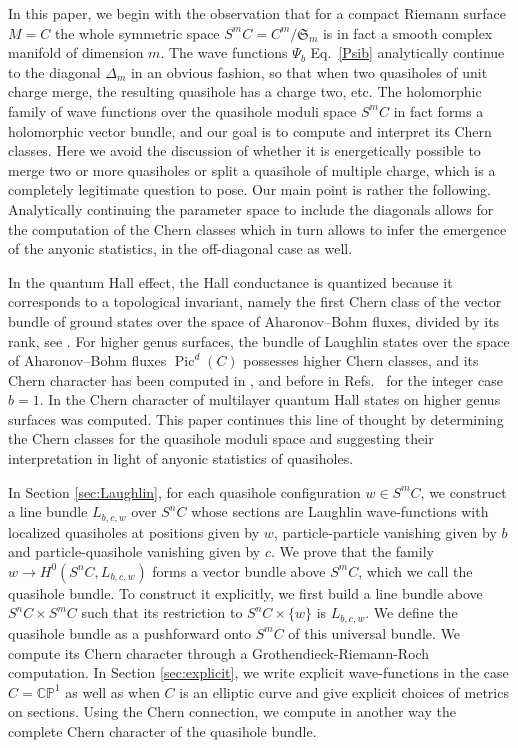 \documentclass{article}
\theoremstyle{definition}
\DeclareMathOperator{\pic}{\text{Pic}}
\newcommand{\pone}{\mathbb{C P}^1}
\begin{document}
In this paper, we begin with the observation that for a compact Riemann surface $M=C$ 
the whole symmetric space $S^mC=C^m/ \mathfrak{S}_m$ is in fact a smooth complex manifold of dimension $m$. 
The wave functions $\Psi_{b}$ Eq.\ \eqref{Psib} analytically continue to the diagonal $\Delta_m$ in an obvious fashion, so that when two quasiholes of unit charge merge, the resulting quasihole has a charge two, etc. The holomorphic family of wave functions over the quasihole moduli space $S^mC$ in fact forms a holomorphic vector bundle, and our goal is to compute and interpret its Chern classes. Here we avoid the discussion of whether it is energetically possible to merge two or more quasiholes or split a quasihole of multiple charge, which is a completely legitimate question to pose. Our main point is rather the following. Analytically continuing the parameter space to include the diagonals allows for the computation of the Chern classes which in turn allows to infer the emergence of the anyonic statistics, in the off-diagonal case as well. 

In the quantum Hall effect, the Hall conductance is quantized because it corresponds to a topological invariant, namely the first Chern class of the vector bundle of ground states over the space of Aharonov–Bohm fluxes, divided by its rank, see \cite{Avron_Seiler_Zograf_1994,Thouless_Kohmoto_Nightingale_Den_Nijs_1982,Klein_Seiler_1990,Simon_1983}. For higher genus surfaces, the bundle of Laughlin states over the space of Aharonov–Bohm fluxes 
$\pic^d(C)$ possesses higher Chern classes, and its Chern character has been computed in \cite{Klevtsov_Zvonkine_2022,Klevtsov_Zvonkine_2025}, and before in Refs.\ \cite{Avron_Seiler_Zograf_1994,Klevtsov2016} for the integer case $b=1$. In \cite{Aldonza_Dupont_2025} the Chern character of multilayer quantum Hall states on higher genus surfaces was computed. This paper continues this line of thought by determining the Chern classes for the quasihole moduli space and suggesting their interpretation in light of anyonic statistics of quasiholes. 

In Section \ref{sec:Laughlin}, for each quasihole configuration $w\in S^m C$, we construct a line bundle $L_{b,c,w}$ over $S^nC$ whose sections are Laughlin wave-functions with localized quasiholes at positions given by $w$, particle-particle vanishing given by $b$ and particle-quasihole vanishing given by $c$. We prove that the family $w \to H^0(S^n C, L_{b,c,w})$ forms a vector bundle above $S^m C$, which we call the quasihole bundle. To construct it explicitly, we first build a line bundle above $S^nC \times S^m C$ such that its restriction to $S^nC \times \lbrace w \rbrace$ is $L_{b,c,w}$. We define the quasihole bundle as a pushforward onto $S^mC$ of this universal bundle. We compute its Chern character through a Grothendieck-Riemann-Roch computation. In Section \ref{sec:explicit}, we write explicit wave-functions in the case $C=\pone$ as well as when $C$ is an elliptic curve and give explicit choices of metrics on sections. Using the Chern connection, we compute in another way the complete Chern character of the quasihole bundle. 
\end{document}
